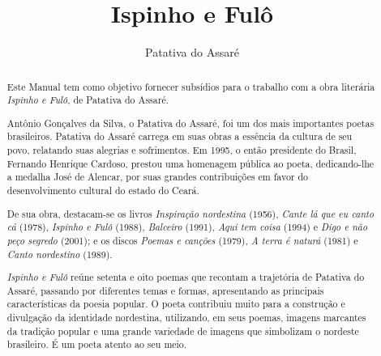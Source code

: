 \documentclass[12pt]{extarticle}
\begin{document}
\newcommand{\AutorLivro}{Patativa do Assaré}
\newcommand{\TituloLivro}{Ispinho e Fulô}
\newcommand{\Tema}{Ficção, mistério e fantasia}
\newcommand{\Genero}{Poema}
\newcommand{\imagemCapa}{./images/PNLD0033-01.png}
\newcommand{\issnppub}{---}
\newcommand{\issnepub}{---}
\newcommand{\colaborador}{Vicente Castro e Bruno Gradella} 


\title{\TituloLivro}
\author{\AutorLivro}
\def\authornotes{\colaborador}

\date{}
\maketitle


\begin{abstract}
Este Manual tem como objetivo fornecer subsídios para o trabalho com a
obra literária \emph{Ispinho e Fulô}, de Patativa do Assaré.

Antônio Gonçalves da Silva, o Patativa do Assaré, foi um dos mais 
importantes poetas brasileiros.  Patativa do Assaré carrega em suas obras 
a essência da cultura de seu povo, relatando suas alegrias e sofrimentos. 
Em 1995, o então presidente do Brasil, Fernando Henrique Cardoso, prestou 
uma homenagem pública ao poeta, dedicando-lhe a medalha José de Alencar, 
por suas grandes contribuições em favor do desenvolvimento cultural do 
estado do Ceará.

De sua obra, destacam-se os livros \textit{Inspiração nordestina} (1956), 
\textit{Cante lá que eu canto cá} (1978), \textit{Ispinho e Fulô} (1988), 
\textit{Balceiro} (1991), \textit{Aqui tem coisa} (1994) e \textit{Digo e 
não peço segredo} (2001); e os discos \textit{Poemas e canções} (1979), 
\textit{A terra é naturá} (1981) e \textit{Canto nordestino} (1989).

\emph{Ispinho e Fulô} reúne setenta e oito poemas que recontam a 
trajetória de Patativa do Assaré, passando por diferentes temas e formas, apresentando as principais características da poesia popular. O poeta 
contribuiu muito para a construção e divulgação da identidade nordestina, 
utilizando, em seus poemas, imagens marcantes da tradição popular e uma 
grande variedade de imagens que simbolizam o nordeste brasileiro. É um 
poeta atento ao seu meio.


\end{abstract}
\end{document}
